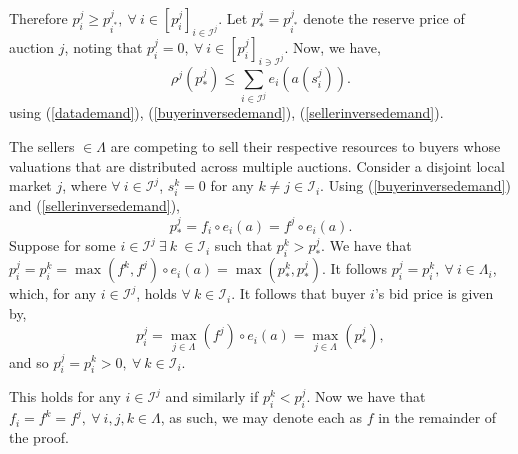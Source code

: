 \documentclass[12pt]{article}
\theoremstyle{definition}
\newcommand{\mcI}{\mathcal{I}}
\begin{document}
\begin{multicols}{2}
Therefore $p_i^j \ge p_{i^*}^j, \ \forall \ i \in
[p_i^j]_{i\in\mcI^j}$. Let $p_*^j=p_{i^*}^j$ denote the reserve
price of auction $j$, noting that $p_i^j=0, \ \forall \ i \in
[p_i^j]_{i\ni\mcI^j}$.
Now, we have,
\begin{equation}\label{rho}
    \rho^j(p_*^j) \le \displaystyle\sum_{i\in\mcI^j} e_i(a(s_i^j)).
\end{equation}
using (\ref{datademand}), (\ref{buyerinversedemand}),
(\ref{sellerinversedemand}).

The sellers $\in\Lambda$ are competing to sell
their respective resources to buyers whose valuations that are distributed across multiple auctions. 
Consider a disjoint local market $j$, where $\forall \ i\in\mcI^j$, $s_i^k = 0$
for any $k\ne j \in \mcI_i$. 
Using (\ref{buyerinversedemand}) and
(\ref{sellerinversedemand}), 
\begin{equation}\label{feq}
    p_*^j = f_i\circ e_i(a) = f^j\circ e_i(a).
\end{equation}
Suppose for some $i\in\mcI^j \ \exists \ k \ \in\mcI_{i}$ such that $p_{i}^k > p_{*}^j$. 
We have that $p_i^j = p_i^k = \max(f^k,f^j) \circ e_i(a)= \max(p_*^k, p_*^j)$.
It follows $p_i^j = p_i^k, \ \forall \ i \in \Lambda_i$,
which, for any $i\in\mcI^j$, holds $\forall \ k\in\mcI_i$.
It follows that buyer $i$'s bid price is given by,
\begin{equation}\label{iprice}
    p_i^j = \max_{j\in\Lambda}(f^j) \circ e_i(a)= \max_{j\in\Lambda}(p_*^j),
\end{equation}
and so $p_i^j = p_i^k > 0, \ \forall \ k \in \mcI_i$.

This holds for any
$i\in\mcI^j$ and similarly if $p_i^k < p_i^j$. 
Now we have that $f_i=f^k=f^j, \ \forall \ i,j,k \in \Lambda$, as such, we may
denote each as $f$ in the remainder of the proof.


\end{multicols}
\end{document}
